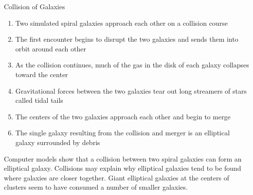 \documentclass[12pt]{article}
\begin{document}
Collision of Galaxies \begin{enumerate} 
\item Two simulated spiral galaxies approach each other on a collision course 
\item The first encounter begins to disrupt the two galaxies and sends them into orbit around each other 
\item As the collision continues, much of the gas in the disk of each galaxy collapses toward the center 
\item Gravitational forces between the two galaxies tear out long streamers of stars called tidal tails 
\item The centers of the two galaxies approach each other and begin to merge 
\item The single galaxy resulting from the collision and merger is an elliptical galaxy surrounded by debris \end{enumerate} 
Computer models show that a collision between two spiral galaxies can form an elliptical galaxy. Collisions may explain why elliptical galaxies tend to be found where galaxies are closer together. Giant elliptical galaxies at the centers of clusters seem to have consumed a number of smaller galaxies. 
\end{document}
